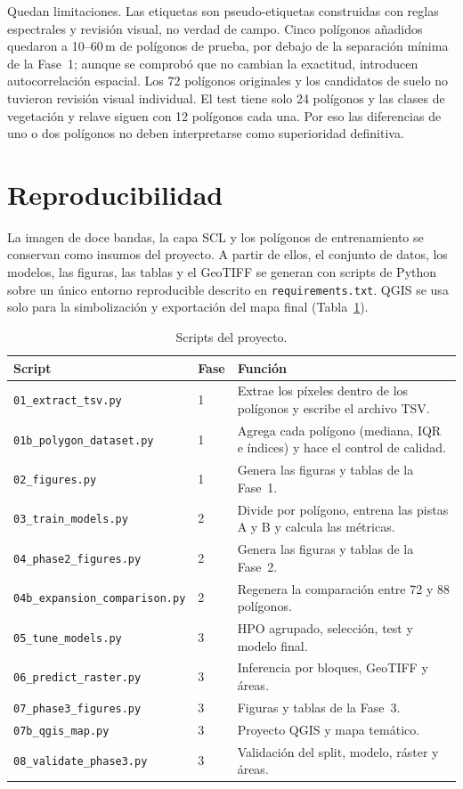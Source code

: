 \documentclass{article}
\begin{document}
Quedan limitaciones. Las etiquetas son pseudo-etiquetas construidas con reglas espectrales y revisión visual, no verdad de campo. Cinco polígonos añadidos quedaron a 10--60\,m de polígonos de prueba, por debajo de la separación mínima de la Fase~1; aunque se comprobó que no cambian la exactitud, introducen autocorrelación espacial. Los 72 polígonos originales y los candidatos de suelo no tuvieron revisión visual individual. El test tiene solo 24 polígonos y las clases de vegetación y relave siguen con 12 polígonos cada una. Por eso las diferencias de uno o dos polígonos no deben interpretarse como superioridad definitiva.

\section{Reproducibilidad}
La imagen de doce bandas, la capa SCL y los polígonos de entrenamiento se conservan como insumos del proyecto. A partir de ellos, el conjunto de datos, los modelos, las figuras, las tablas y el GeoTIFF se generan con scripts de Python sobre un único entorno reproducible descrito en \texttt{requirements.txt}. QGIS se usa solo para la simbolización y exportación del mapa final (Tabla~\ref{tab:scripts}).

\begin{table}[htbp]
 \centering
 \caption{Scripts del proyecto.}
 \label{tab:scripts}
 \begin{tabularx}{\textwidth}{llX}
  \toprule
  Script & Fase & Función \\
  \midrule
  \texttt{01\_extract\_tsv.py} & 1 & Extrae los píxeles dentro de los polígonos y escribe el archivo TSV. \\
  \texttt{01b\_polygon\_dataset.py} & 1 & Agrega cada polígono (mediana, IQR e índices) y hace el control de calidad. \\
  \texttt{02\_figures.py} & 1 & Genera las figuras y tablas de la Fase~1. \\
  \texttt{03\_train\_models.py} & 2 & Divide por polígono, entrena las pistas A y B y calcula las métricas. \\
  \texttt{04\_phase2\_figures.py} & 2 & Genera las figuras y tablas de la Fase~2. \\
  \texttt{04b\_expansion\_comparison.py} & 2 & Regenera la comparación entre 72 y 88 polígonos. \\
  \texttt{05\_tune\_models.py} & 3 & HPO agrupado, selección, test y modelo final. \\
  \texttt{06\_predict\_raster.py} & 3 & Inferencia por bloques, GeoTIFF y áreas. \\
  \texttt{07\_phase3\_figures.py} & 3 & Figuras y tablas de la Fase~3. \\
  \texttt{07b\_qgis\_map.py} & 3 & Proyecto QGIS y mapa temático. \\
  \texttt{08\_validate\_phase3.py} & 3 & Validación del split, modelo, ráster y áreas. \\
  \bottomrule
 \end{tabularx}
\end{table}
\end{document}
